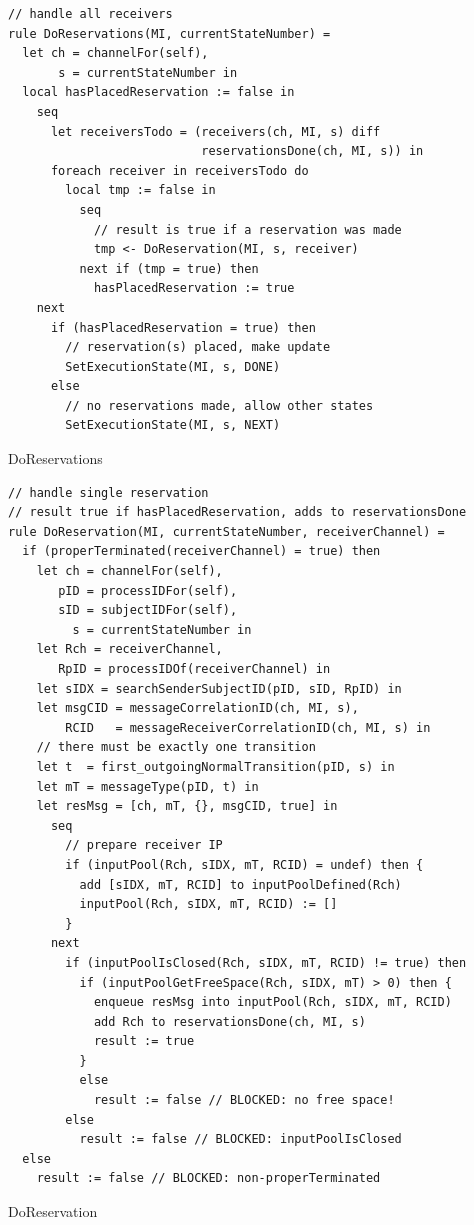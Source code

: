 \begin{listing}[H]
\begin{verbatim}
// handle all receivers
rule DoReservations(MI, currentStateNumber) =
  let ch = channelFor(self),
       s = currentStateNumber in
  local hasPlacedReservation := false in
    seq
      let receiversTodo = (receivers(ch, MI, s) diff
                           reservationsDone(ch, MI, s)) in
      foreach receiver in receiversTodo do
        local tmp := false in
          seq
            // result is true if a reservation was made
            tmp <- DoReservation(MI, s, receiver)
          next if (tmp = true) then
            hasPlacedReservation := true
    next
      if (hasPlacedReservation = true) then
        // reservation(s) placed, make update
        SetExecutionState(MI, s, DONE)
      else
        // no reservations made, allow other states
        SetExecutionState(MI, s, NEXT)
\end{verbatim}
\caption{DoReservations}
\label{lst:asm:DoReservations}
\end{listing}





\begin{listing}[H]
\begin{verbatim}
// handle single reservation
// result true if hasPlacedReservation, adds to reservationsDone
rule DoReservation(MI, currentStateNumber, receiverChannel) =
  if (properTerminated(receiverChannel) = true) then
    let ch = channelFor(self),
       pID = processIDFor(self),
       sID = subjectIDFor(self),
         s = currentStateNumber in
    let Rch = receiverChannel,
       RpID = processIDOf(receiverChannel) in
    let sIDX = searchSenderSubjectID(pID, sID, RpID) in
    let msgCID = messageCorrelationID(ch, MI, s),
        RCID   = messageReceiverCorrelationID(ch, MI, s) in
    // there must be exactly one transition
    let t  = first_outgoingNormalTransition(pID, s) in
    let mT = messageType(pID, t) in
    let resMsg = [ch, mT, {}, msgCID, true] in
      seq
        // prepare receiver IP
        if (inputPool(Rch, sIDX, mT, RCID) = undef) then {
          add [sIDX, mT, RCID] to inputPoolDefined(Rch)
          inputPool(Rch, sIDX, mT, RCID) := []
        }
      next
        if (inputPoolIsClosed(Rch, sIDX, mT, RCID) != true) then
          if (inputPoolGetFreeSpace(Rch, sIDX, mT) > 0) then {
            enqueue resMsg into inputPool(Rch, sIDX, mT, RCID)
            add Rch to reservationsDone(ch, MI, s)
            result := true
          }
          else
            result := false // BLOCKED: no free space!
        else
          result := false // BLOCKED: inputPoolIsClosed
  else
    result := false // BLOCKED: non-properTerminated
\end{verbatim}
\caption{DoReservation}
\label{lst:asm:DoReservation}
\end{listing}





